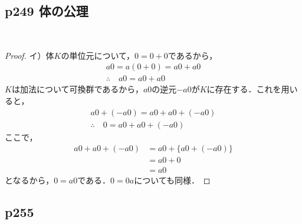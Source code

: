 \documentclass[dvipdfmx,uplatex,11pt]{jsarticle}
\begin{document}
\subsection{p249 体の公理}
​
\begin{leftbar}
	\begin{proof}
		イ）\quad 体$K$の単位元について，$0=0+0$であるから，
		\begin{gather*}
			a 0=a(0+0)=a0 + a0\\
			\therefore \quad  a0 = a0 + a0
		\end{gather*}
		$K$は加法について可換群であるから，$a0$の逆元$-a0$が$K$に存在する．これを用いると，
\begin{gather*}
	a0 + (-a0) = a0 + a0 + (-a0) \\
	\therefore \quad 0 = a0 + a0 +(-a0)
\end{gather*}
 ここで，
 \begin{align*}
	a0 + a0 +(-a0)&=a0+ \{a0+(-a0)\} \\
	& = a0 + 0 \\
	& = a0
 \end{align*}
となるから，$0=a0$である．$0=0a$についても同様．
\end{proof}
\end{leftbar}


\setcounter{equation}{0}
\subsection{p255}
\end{document}
